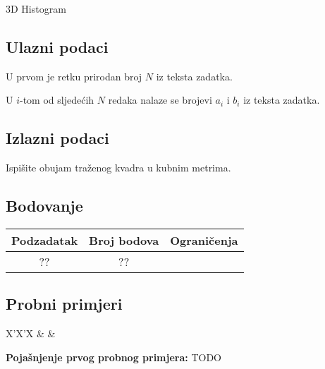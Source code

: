 \begin{statement}[
  problempoints=100,
  timelimit=1 sekunda,
  memorylimit=512 MiB,
]{3D Histogram}
\subsection*{Ulazni podaci}
U prvom je retku prirodan broj $N$ iz teksta zadatka.

U $i$-tom od sljedećih $N$ redaka nalaze se brojevi $a_i$ i $b_i$ iz
teksta zadatka.

\subsection*{Izlazni podaci}
Ispišite obujam traženog kvadra u kubnim metrima.

\subsection*{Bodovanje}
{\renewcommand{\arraystretch}{1.4}
  \setlength{\tabcolsep}{6pt}
  \begin{tabular}{ccl}
 Podzadatak & Broj bodova & Ograničenja \\ \midrule
  ?? & ?? &  \\
\end{tabular}}

\subsection*{Probni primjeri}
\begin{tabularx}{\textwidth}{X'X'X}
 &
 &
\end{tabularx}

\textbf{Pojašnjenje prvog probnog primjera:} TODO

\end{statement}

